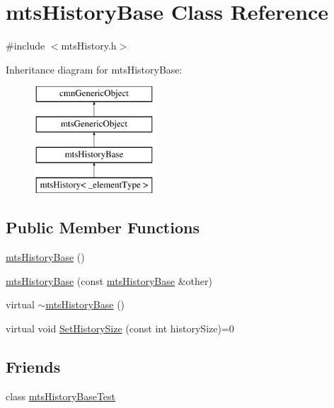 \hypertarget{classmts_history_base}{}\section{mts\+History\+Base Class Reference}
\label{classmts_history_base}


{\ttfamily \#include $<$mts\+History.\+h$>$}

Inheritance diagram for mts\+History\+Base\+:\begin{figure}[H]
\begin{center}
\leavevmode
\includegraphics[height=4.000000cm]{d3/d4e/classmts_history_base}
\end{center}
\end{figure}
\subsection*{Public Member Functions}
\begin{DoxyCompactItemize}
\item 
\hyperlink{classmts_history_base_ab1be142d2daac21c1a6971bbc0540a46}{mts\+History\+Base} ()
\item 
\hyperlink{classmts_history_base_a389cde5558d565468611d99bb524ed11}{mts\+History\+Base} (const \hyperlink{classmts_history_base}{mts\+History\+Base} \&other)
\item 
virtual \hyperlink{classmts_history_base_a85f8ab2e3e7b97d129f04753486b12d7}{$\sim$mts\+History\+Base} ()
\item 
virtual void \hyperlink{classmts_history_base_a737a74f1689e5e13806feb7f0c1f9fda}{Set\+History\+Size} (const int history\+Size)=0
\end{DoxyCompactItemize}
\subsection*{Friends}
\begin{DoxyCompactItemize}
\item 
class \hyperlink{classmts_history_base_a45c74443e3df647dafe639ff0e9e74f8}{mts\+History\+Base\+Test}
\end{DoxyCompactItemize}


